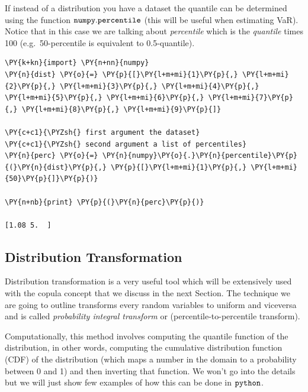     If instead of a distribution you have a dataset the quantile can be
determined using the function \(\tt{numpy.percentile}\) (this will be
useful when estimating VaR). Notice that in this case we are talking
about \emph{percentile} which is the \emph{quantile} times 100
(e.g.~50-percentile is equivalent to 0.5-quantile).

\begin{tcolorbox}[breakable, size=fbox, boxrule=1pt, pad at break*=1mm,colback=cellbackground, colframe=cellborder]
\begin{Verbatim}[commandchars=\\\{\}]
\PY{k+kn}{import} \PY{n+nn}{numpy}
\PY{n}{dist} \PY{o}{=} \PY{p}{[}\PY{l+m+mi}{1}\PY{p}{,} \PY{l+m+mi}{2}\PY{p}{,} \PY{l+m+mi}{3}\PY{p}{,} \PY{l+m+mi}{4}\PY{p}{,} \PY{l+m+mi}{5}\PY{p}{,} \PY{l+m+mi}{6}\PY{p}{,} \PY{l+m+mi}{7}\PY{p}{,} \PY{l+m+mi}{8}\PY{p}{,} \PY{l+m+mi}{9}\PY{p}{]}

\PY{c+c1}{\PYZsh{} first argument the dataset}
\PY{c+c1}{\PYZsh{} second argument a list of percentiles}
\PY{n}{perc} \PY{o}{=} \PY{n}{numpy}\PY{o}{.}\PY{n}{percentile}\PY{p}{(}\PY{n}{dist}\PY{p}{,} \PY{p}{[}\PY{l+m+mi}{1}\PY{p}{,} \PY{l+m+mi}{50}\PY{p}{]}\PY{p}{)}

\PY{n+nb}{print} \PY{p}{(}\PY{n}{perc}\PY{p}{)}

[1.08 5.  ]
    \end{Verbatim}
\end{tcolorbox}

\subsection{Distribution Transformation}\label{distribution-transformation}

Distribution transformation is a very useful tool which will be
extensively used with the copula concept that we discuss in the next
Section. The technique we are going to outline transforms every random
variables to uniform and viceversa and is called
\emph{probability integral transform} or (percentile-to-percentile
transform).

Computationally, this method involves computing the quantile function of
the distribution, in other words, computing the cumulative
distribution function (CDF) of the distribution (which maps a number in
the domain to a probability between 0 and 1) and then inverting that
function. We won't go into the details but we will just show few
examples of how this can be done in \(\tt{python}\).

